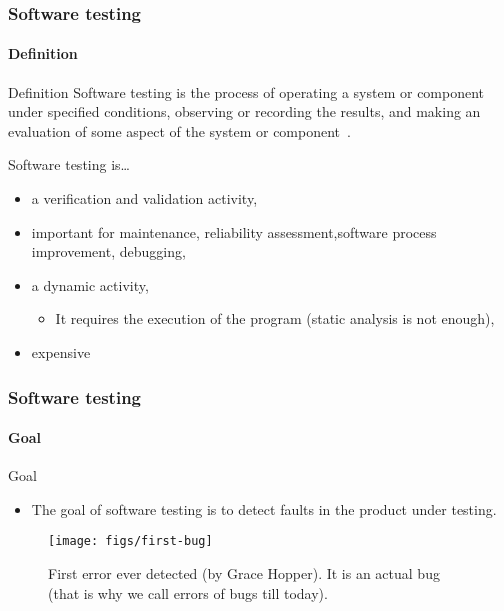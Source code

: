 \begin{frame}[hasprev=true, hasnext=true]
\frametitle{Software testing}
\framesubtitle{Definition}
\label{concept:software-testing}

\begin{block:concept}{Definition}
Software testing is the process of operating a system or component under
specified conditions, observing or recording the results, and  making
an evaluation of some aspect of the system or component~\cite{ieee610.12:1990}.
\end{block:concept}

\begin{block:fact}{Software testing is\dots{}}
\begin{itemize}
	\item a verification and validation activity,

	\item important for maintenance, reliability assessment,software process
	improvement, debugging,

	\item a dynamic activity,
	\begin{itemize}
		\item It requires the execution of the program (static analysis is
		not enough),
	\end{itemize}

	\item expensive~\cite{harrold:2000}
\end{itemize}
\end{block:fact}
\end{frame}



\begin{frame}
\frametitle{Software testing}
\framesubtitle{Goal}

\begin{block:fact}{Goal}
\begin{itemize}
	\item The goal of software testing is to detect faults in the product
	under testing.
\end{itemize}
\end{block:fact}

\begin{figure}
	\centering
	\texttt{[image: figs/first-bug]}
	\caption{First error ever detected (by Grace Hopper). It is an actual bug
	(that is why we call errors of bugs till today).}
\end{figure}
\end{frame}



